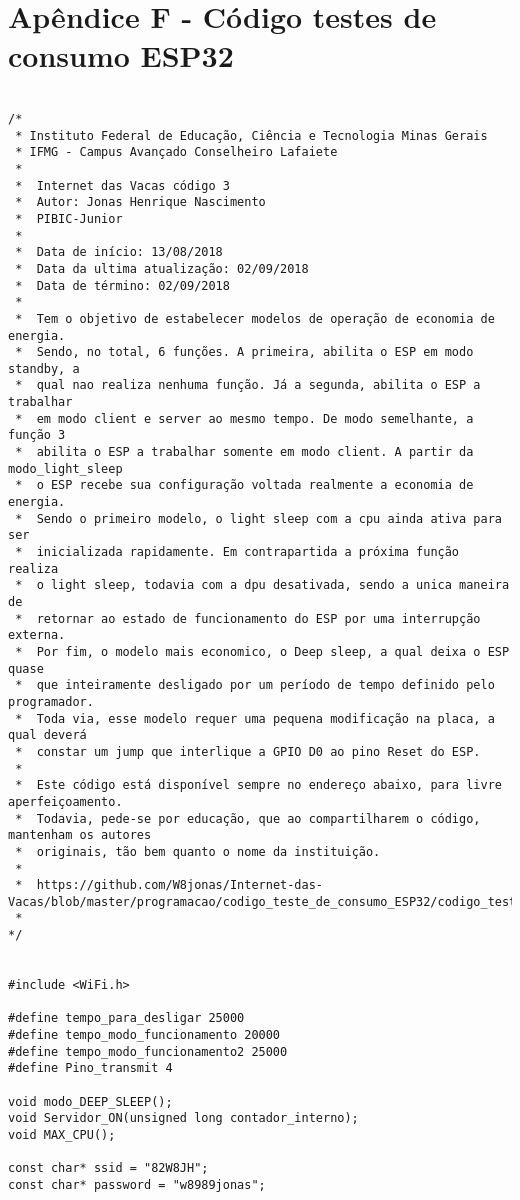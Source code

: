 \newpage
\section{Apêndice F - Código testes de consumo ESP32}
\label{sc:apendice_f_}


\begin{lstlisting}

/*
 * Instituto Federal de Educação, Ciência e Tecnologia Minas Gerais
 * IFMG - Campus Avançado Conselheiro Lafaiete 
 * 
 *  Internet das Vacas código 3
 *  Autor: Jonas Henrique Nascimento
 *  PIBIC-Junior
 * 
 *  Data de início: 13/08/2018
 *  Data da ultima atualização: 02/09/2018
 *  Data de término: 02/09/2018
 *  
 *  Tem o objetivo de estabelecer modelos de operação de economia de energia.
 *  Sendo, no total, 6 funções. A primeira, abilita o ESP em modo standby, a 
 *  qual nao realiza nenhuma função. Já a segunda, abilita o ESP a trabalhar
 *  em modo client e server ao mesmo tempo. De modo semelhante, a função 3
 *  abilita o ESP a trabalhar somente em modo client. A partir da modo_light_sleep
 *  o ESP recebe sua configuração voltada realmente a economia de energia. 
 *  Sendo o primeiro modelo, o light sleep com a cpu ainda ativa para ser 
 *  inicializada rapidamente. Em contrapartida a próxima função realiza
 *  o light sleep, todavia com a dpu desativada, sendo a unica maneira de
 *  retornar ao estado de funcionamento do ESP por uma interrupção externa.
 *  Por fim, o modelo mais economico, o Deep sleep, a qual deixa o ESP quase
 *  que inteiramente desligado por um período de tempo definido pelo programador.
 *  Toda via, esse modelo requer uma pequena modificação na placa, a qual deverá
 *  constar um jump que interlique a GPIO D0 ao pino Reset do ESP.
 * 
 *  Este código está disponível sempre no endereço abaixo, para livre aperfeiçoamento. 
 *  Todavia, pede-se por educação, que ao compartilharem o código, mantenham os autores
 *  originais, tão bem quanto o nome da instituição.
 *  
 *  https://github.com/W8jonas/Internet-das-Vacas/blob/master/programacao/codigo_teste_de_consumo_ESP32/codigo_teste_de_consumo_ESP32.ino
 *  
*/


#include <WiFi.h>

#define tempo_para_desligar 25000
#define tempo_modo_funcionamento 20000
#define tempo_modo_funcionamento2 25000
#define Pino_transmit 4

void modo_DEEP_SLEEP();
void Servidor_ON(unsigned long contador_interno);
void MAX_CPU();

const char* ssid = "82W8JH";
const char* password = "w8989jonas";


\end{lstlisting}
